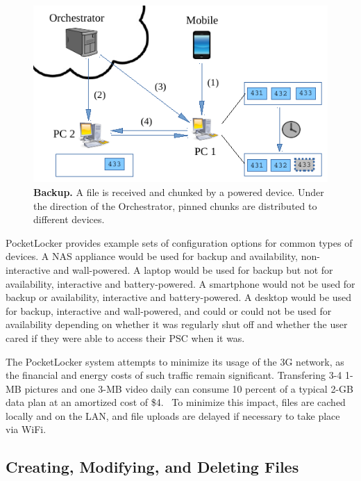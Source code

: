 \begin{figure}[t]

\includegraphics{./figures/backup.pdf}

\caption{\small \textbf{Backup.} A file is received and chunked by a powered
device.  Under the direction of the Orchestrator, pinned chunks are
distributed to different devices.}

\label{fig-design-backup}

\vspace*{-0.2in}
\end{figure}
PocketLocker provides example sets of configuration options for common types
of devices. A NAS appliance would be used for backup and availability,
non-interactive and wall-powered. A laptop would be used for backup but not
for availability, interactive and battery-powered. A smartphone would not be
used for backup or availability, interactive and battery-powered. A desktop
would be used for backup, interactive and wall-powered, and could or could
not be used for availability depending on whether it was regularly shut off
and whether the user cared if they were able to access their PSC when it was.

The PocketLocker system attempts to minimize its usage of the 3G network, as
the financial and energy costs of such traffic remain significant.  Transfering
3-4 1-MB pictures and one 3-MB video daily can consume 10 percent of a typical
2-GB data plan at an amortized cost of \$4.~\cite{att-prices,verizon-prices}
To minimize this impact, files are cached locally and on the LAN, and file
uploads are delayed if necessary to take place via WiFi.

\subsection{Creating, Modifying, and Deleting Files}

